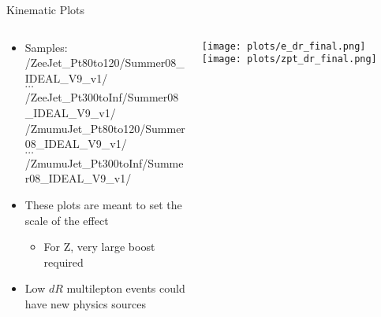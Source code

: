 \documentclass{beamer}
\begin{document}
\begin{frame}{Kinematic Plots}
  \begin{columns}
    \begin{column}{6cm}%
      \begin{itemize}
      \item Samples: \\ {\tiny{/ZeeJet\_Pt80to120/Summer08\_IDEAL\_V9\_v1/} \\ \normalsize{$\cdots$} \\ \vspace{-0.1cm}\tiny{/ZeeJet\_Pt300toInf/Summer08\_IDEAL\_V9\_v1/}}
        \\ {\tiny{/ZmumuJet\_Pt80to120/Summer08\_IDEAL\_V9\_v1/} \\ \normalsize{$\cdots$} \\ \vspace{-0.1cm}\tiny{/ZmumuJet\_Pt300toInf/Summer08\_IDEAL\_V9\_v1/}}
        \bigskip
      \item These plots are meant to set the scale of the effect
        \begin{itemize}
        \item For Z, very large boost required
        \end{itemize}
        \item Low $dR$ multilepton events could have new physics sources
      \end{itemize}
    \end{column}
    
    \begin{column}{6cm}
      \texttt{[image: plots/e\_dr\_final.png]}
      \vspace{-0.cm}
      \texttt{[image: plots/zpt\_dr\_final.png]} %
    \end{column}
    
  \end{columns}
\end{frame}
\end{document}
